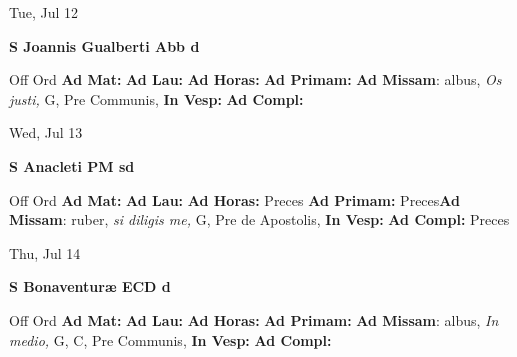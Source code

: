 \documentclass[10pt]{memoir}
\begin{document}
\begin{center}
\begin{minipage}{3.5in}
\vspace{2em}
\begin{center}Tue, Jul 12
\end{center}
\textbf{ \large S Joannis Gualberti Abb
\textnormal{\normalsize d}}

\begin{justify}Off Ord
\textbf{Ad Mat: }
\textbf{Ad Lau: }
\textbf{Ad Horas: }
\textbf{Ad Primam: }\textbf{Ad Missam}: albus, \textit{Os justi,} G, Pre Communis, 
\textbf{In Vesp: }
\textbf{Ad Compl: }
\end{justify}
\end{minipage}
\end{center}

\begin{center}
\begin{minipage}{3.5in}
\vspace{2em}
\begin{center}Wed, Jul 13
\end{center}
\textbf{ \large S Anacleti PM
\textnormal{\normalsize sd}}

\begin{justify}Off Ord
\textbf{Ad Mat: }
\textbf{Ad Lau: }
\textbf{Ad Horas: }Preces
\textbf{Ad Primam: }Preces\textbf{Ad Missam}: ruber, \textit{si diligis me,} G, Pre de Apostolis, 
\textbf{In Vesp: }
\textbf{Ad Compl: }Preces
\end{justify}
\end{minipage}
\end{center}

\begin{center}
\begin{minipage}{3.5in}
\vspace{2em}
\begin{center}Thu, Jul 14
\end{center}
\textbf{ \large S Bonaventuræ ECD
\textnormal{\normalsize d}}

\begin{justify}Off Ord
\textbf{Ad Mat: }
\textbf{Ad Lau: }
\textbf{Ad Horas: }
\textbf{Ad Primam: }\textbf{Ad Missam}: albus, \textit{In medio,} G, C, Pre Communis, 
\textbf{In Vesp: }
\textbf{Ad Compl: }
\end{justify}
\end{minipage}
\end{center}
\end{document}
